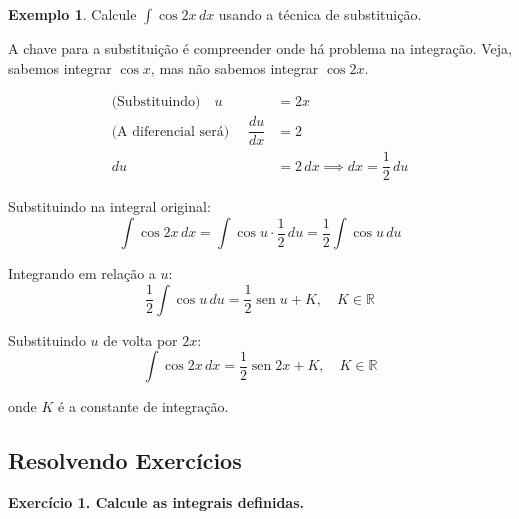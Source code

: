 \documentclass[12pt,openright,twoside,a4paper]{article}
\theoremstyle{definition}
\newtheorem{example}{Exemplo}[section]
\renewcommand{\sin}{\operatorname{sen}} %
\begin{document}
		\begin{example} Calcule $\displaystyle \int \cos{2x} \, dx$ usando a técnica de substituição.
		
		A chave para a substituição é compreender onde há problema na integração. Veja, sabemos integrar $\cos{x}$, mas não sabemos integrar $\cos{2x}$.
		
			\begin{align*}
				\text{(Substituindo)} \quad u &= 2x \\
				\text{(A diferencial será) } \quad \dfrac{du}{dx} &= 2 \\
				du &= 2 \, dx \implies dx = \dfrac{1}{2} \, du
			\end{align*}
			
			Substituindo na integral original:
			$$
			\int \cos{2x} \, dx = \int \cos{u} \cdot \dfrac{1}{2} \, du = \dfrac{1}{2} \int \cos{u} \, du
			$$
			
			Integrando em relação a $u$:
			$$
			\dfrac{1}{2} \int \cos{u} \, du = \dfrac{1}{2} \sin{u} + K, \quad K \in \mathbb{R}
			$$
			
			Substituindo $u$ de volta por $2x$:
			$$
			\int \cos{2x} \, dx = \dfrac{1}{2} \sin{2x} + K, \quad K \in \mathbb{R}
			$$
			
			onde $K$ é a constante de integração.
		\end{example}
	\subsection{Resolvendo Exercícios}
	
	\textbf{Exercício 1. Calcule as integrais definidas.}
	
\end{document}
